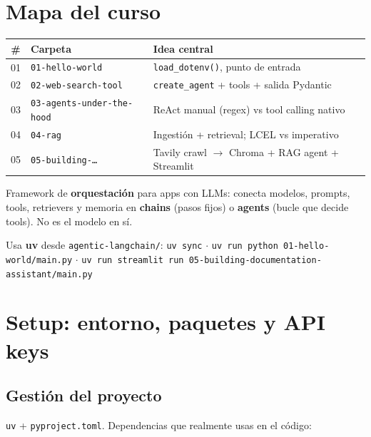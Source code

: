 \documentclass[11pt,a4paper]{article}
\begin{document}
\section{Mapa del curso}

\begin{center}
\begin{tabular}{@{}clp{8.4cm}@{}}
\toprule
\textbf{\#} & \textbf{Carpeta} & \textbf{Idea central} \\
\midrule
01 & \texttt{01-hello-world} & \texttt{load\_dotenv()}, punto de entrada \\
02 & \texttt{02-web-search-tool} & \texttt{create\_agent} + tools + salida Pydantic \\
03 & \texttt{03-agents-under-the-hood} & ReAct manual (regex) vs tool calling nativo \\
04 & \texttt{04-rag} & Ingestión + retrieval; LCEL vs imperativo \\
05 & \texttt{05-building-\ldots} & Tavily crawl $\to$ Chroma + RAG agent + Streamlit \\
\bottomrule
\end{tabular}
\end{center}

\begin{concept}[title=¿Qué es LangChain?]
Framework de \textbf{orquestación} para apps con LLMs: conecta modelos, prompts, tools, retrievers y memoria en \textbf{chains} (pasos fijos) o \textbf{agents} (bucle que decide tools).
No es el modelo en sí.
\end{concept}

\begin{tip}[title=Cómo correr cosas en este repo]
Usa \textbf{uv} desde \texttt{agentic-langchain/}:
\texttt{uv sync} $\cdot$
\texttt{uv run python 01-hello-world/main.py} $\cdot$
\texttt{uv run streamlit run 05-building-documentation-assistant/main.py}
\end{tip}

\section{Setup: entorno, paquetes y API keys}

\subsection{Gestión del proyecto}
\texttt{uv} + \texttt{pyproject.toml}. Dependencias que realmente usas en el código:
\end{document}
